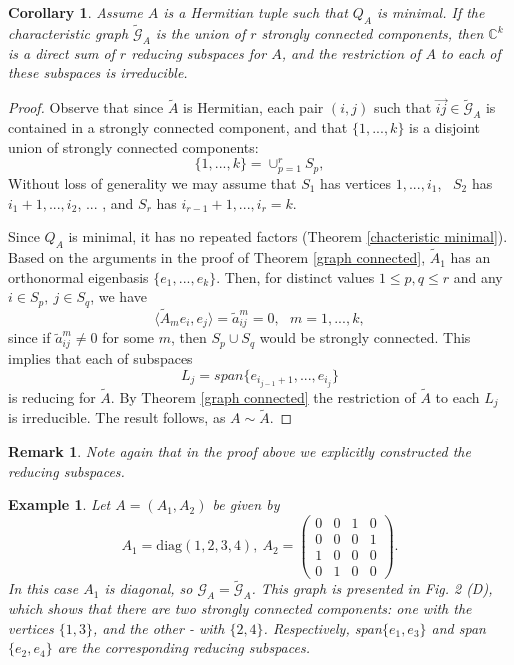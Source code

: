\documentclass[draft, 12pt, reqno]{amsart}
\newcommand{\C}{{\mathbb C}}
\numberwithin{equation}{section}
\theoremstyle{plain}
\newtheorem{corollary}[theorem]{Corollary}
\newtheorem{example}[theorem]{Example}
\newtheorem{remark}[theorem]{Remark}
\begin{document}
\begin{corollary}\label{components1}
Assume $A$ is a Hermitian tuple such that $Q_A$ is minimal. If the characteristic graph $\widetilde{\mathcal{G}}_A$ is the union of $r$ strongly connected components, then  $\C^k$ is a direct sum of $r$ reducing subspaces for $A$, and the restriction of $A$ to each of these subspaces  is irreducible. 	
\end{corollary}
\begin{proof}
Observe that since  $\widetilde{A}$ is Hermitian, each pair $(i,j)$ such that $\overrightarrow{ij}\in \widetilde{\mathcal{G}}_A$ is contained in a strongly connected component, and that $\{1,...,k\}$ is a disjoint union of strongly connected components:
$$\{1,...,k\}=\cup_{p=1}^r S_p,  $$
Without loss of generality we may assume that $S_1$ has vertices $1,...,i_1$, \ $S_2$ has $i_1+1,..., i_2$, ... , and $S_r$ has $i_{r-1}+1,...,i_r=k$. 	 

Since $Q_A$ is minimal, it has no repeated factors (Theorem \ref{chacteristic minimal}). Based on the arguments in the proof of Theorem \ref{graph connected}, $\widetilde{A}_1$ has an orthonormal eigenbasis $\{e_1,...,e_k\}$. Then, for distinct values $1\leq p,q \leq r$ and any $i\in S_p, \ j\in S_q$, we have 
\begin{equation}\label{amij}
\langle \widetilde{A}_me_i, e_j\rangle=\widetilde{a}^m_{ij}=0, \ \ \ m=1, ..., k,
\end{equation}
since if $\widetilde{a}_{ij}^m\neq 0$ for some $m$, then $S_p\cup S_q$ would be strongly connected. This implies that each of subspaces
$$ L_j=span \{e_{i_{j-1}+1},..., e_{i_j} \}$$
is reducing for $\widetilde{A}$. By Theorem \ref{graph connected} the restriction of $\widetilde{A}$ to each $L_j$ is irreducible. The result follows, as $A\sim \widetilde{A}$.
\end{proof}

\begin{remark}
\normalfont Note again that in the proof above we explicitly constructed the reducing subspaces.	
\end{remark}

\begin{example}
\normalfont Let $A=(A_1,A_2)$ be given by
$$A_1=\mbox{diag}(1,2,3,4), \ A_2=\left( \begin{array}{cccc} 0&0& 1& 0 \\ 0&0&0 &1\\1&0&0&0 \\0&1&0&0\end{array}\right). $$	
In this case $A_1$ is diagonal, so $\mathcal{G}_A=\widetilde{\mathcal{G}}_A$. This graph is presented in Fig. 2 (D), which shows that there are two strongly connected components: one with the vertices $\{1,3\}$, and the other - with $\{2,4\}$. Respectively, span$\{e_1,e_3\}$ and span$\{e_2,e_4\}$ are the corresponding reducing subspaces.
\end{example}
\end{document}

